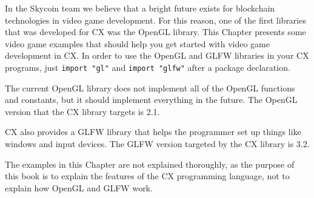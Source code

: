 \documentclass[11pt,fleqn,openany]{book} %
\begin{document}

In the Skycoin team we believe that a bright future exists for blockchain technologies in video game development. For this reason, one of the first libraries that was developed for CX was the OpenGL library. This Chapter presents some video game examples that should help you get started with video game development in CX. In order to use the OpenGL and GLFW libraries in your CX programs, just \lstinline{import "gl"} and \lstinline{import "glfw"} after a package declaration.

The current OpenGL library does not implement all of the OpenGL functions and constants, but it should implement everything in the future. The OpenGL version that the CX library targets is 2.1.

CX also provides a GLFW library that helps the programmer set up things like windows and input devices. The GLFW version targeted by the CX library is 3.2.

The examples in this Chapter are not explained thoroughly, as the purpose of this book is to explain the features of the CX programming language, not to explain how OpenGL and GLFW work.
\end{document}
